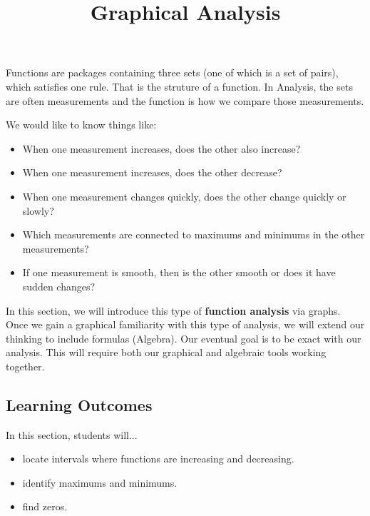 \documentclass{ximera}
\title{Graphical Analysis}
\begin{document}
\begin{abstract}
\end{abstract}
\maketitle




Functions are packages containing three sets (one of which is a set of pairs), which satisfies one rule.  That is the struture of a function.  In Analysis, the sets are often measurements and the function is how we compare those measurements.

We would like to know things like:

\begin{itemize}
\item When one measurement increases, does the other also increase?
\item When one measurement increases, does the other decrease?
\item When one measurement changes quickly, does the other change quickly or slowly?
\item Which measurements are connected to maximums and minimums in the other measurements?
\item If one measurement is smooth, then is the other smooth or does it have sudden changes?
\end{itemize}


In this section, we will introduce this type of \textbf{function analysis} via graphs. Once we gain a graphical familiarity with this type of analysis, we will extend our thinking to include formulas (Algebra).  Our eventual goal is to be exact with our analysis.  This will require both our graphical and algebraic tools working together.









\subsection{Learning Outcomes}

\begin{sectionOutcomes}
In this section, students will...

\begin{itemize}
\item locate intervals where functions are increasing and decreasing.
\item identify maximums and minimums.
\item find zeros.
\end{itemize}
\end{sectionOutcomes}
\end{document}
